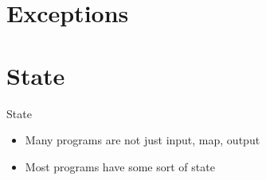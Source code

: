 \documentclass[aspectratio=169,notes]{beamer}
\begin{document}
	\section{Exceptions}
	

	\section{State}

	\begin{frame}[fragile]{State}
		\begin{itemize}
			\item Many programs are not just input, map, output
			\item Most programs have some sort of state
		\end{itemize}
	\end{frame}
\end{document}
